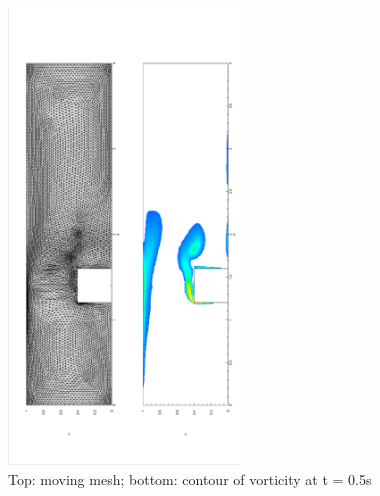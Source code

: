       \begin{figure}[!htbp]
        \centering
        \includegraphics[width = 0.55\textwidth, angle = -90]{picture/first/step_flow_data/mesh_t_05.eps}
        \caption{\small Top: moving mesh; bottom: contour of vorticity
          at t = 0.5s}
        \label{fig::step_flow_05s}
      \end{figure}

